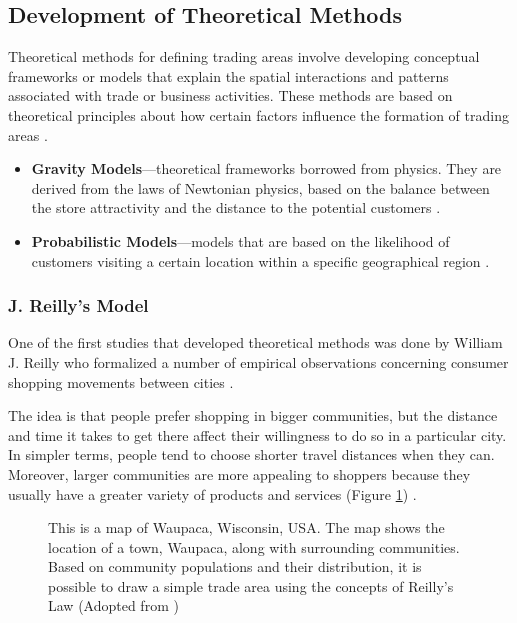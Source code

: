 \subsection{Development of Theoretical Methods}

Theoretical methods for defining trading areas involve developing conceptual frameworks or models that explain the spatial interactions and patterns associated with trade or business activities. These methods are based on theoretical principles about how certain factors influence the formation of trading areas \cite{mendes2004multi}.

\begin{itemize}
    \item \textbf{Gravity Models}---theoretical frameworks borrowed from physics. They are derived from the laws of Newtonian physics, based on the balance between the store attractivity and the distance to the potential customers \cite{mendes2004multi}.
    \item \textbf{Probabilistic Models}---models that are based on the likelihood of customers visiting a certain location within a specific geographical region \cite{huff1964defining}.
\end{itemize}

\subsubsection{J. Reilly's Model}

One of the first studies that developed theoretical methods was done by William J. Reilly who formalized a number of empirical observations concerning consumer shopping movements between cities \cite{huff1964defining}.

 The idea is that people prefer shopping in bigger communities, but the distance and time it takes to get there affect their willingness to do so in a particular city. In simpler terms, people tend to choose shorter travel distances when they can. Moreover, larger communities are more appealing to shoppers because they usually have a greater variety of products and services (Figure \ref{fig:reilyModel}) \cite{web2022trade}.

\begin{figure}[t]
	\centering
	
	\caption{This is a map of Waupaca, Wisconsin, USA. The map shows the location of a town, Waupaca, along with surrounding communities. Based on community populations and their distribution, it is possible to draw a simple trade area using the concepts of Reilly’s Law (Adopted from \cite{tradeareaanalysis})}
\label{fig:reilyModel}
\end{figure}

